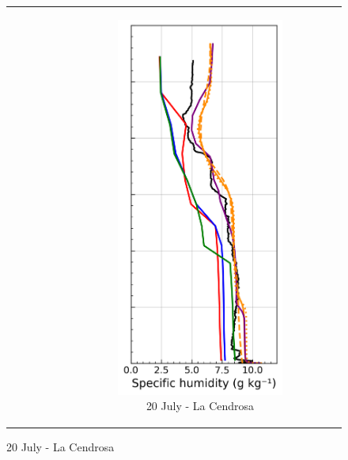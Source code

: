 \begin{figure}[hbtp]
{\begin{tabular}{@{}cccc@{}}
\begin{subfigure}[t]{0.285\textwidth}
        \end{subfigure} &
        \begin{subfigure}[t]{0.29\textwidth}
            \caption{20 July - La Cendrosa}
            \includegraphics[width=\textwidth]{images/chap6/profiles/profile_cendrosa_ovap_2007_sensbins.png}

\end{subfigure}
\end{tabular}}
\end{figure}
